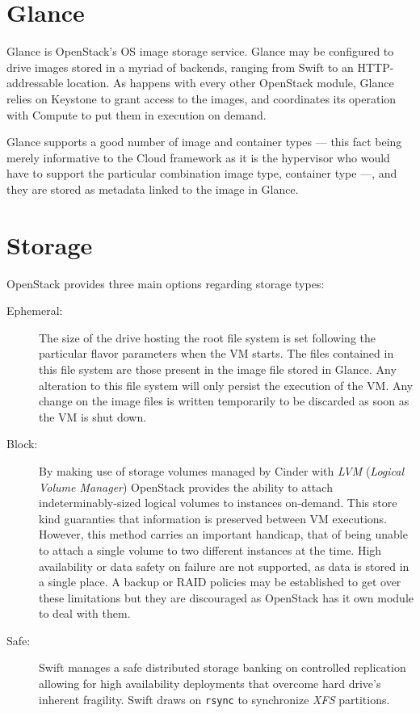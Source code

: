 \section{Glance}\label{sec:glance}
\noindent Glance is OpenStack's OS image storage service. Glance may be configured to drive images stored in a myriad of backends, ranging from Swift to an HTTP-addressable location. As happens with every other OpenStack module, Glance relies on Keystone to grant access to the images, and coordinates its operation with Compute to put them in execution on demand.

Glance supports a good number of image and container types --- this fact being merely informative to the Cloud framework as it is the hypervisor who would have to support the particular combination image type, container type ---, and they are stored as metadata linked to the image in Glance.

\section{Storage}\label{sec:almacenamiento}
\noindent OpenStack provides three main options regarding storage types:

\begin{description}
 \item[Ephemeral:] The size of the drive hosting the root file system is set following the particular flavor parameters when the VM starts. The files contained in this file system are those present in the image file stored in Glance. Any alteration to this file system will only persist the execution of the VM. Any change on the image files is written temporarily to be discarded as soon as the VM is shut down.
 \item[Block:] By making use of storage volumes managed by Cinder with \emph{LVM} (\emph{Logical Volume Manager}) OpenStack provides the ability to attach indeterminably-sized logical volumes to instances on-demand. This store kind guaranties that information is preserved between VM executions. However, this method carries an important handicap, that of being unable to attach a single volume to two different instances at the time. High availability or data safety on failure are not supported, as data is stored in a single place. A backup or RAID policies may be established to get over these limitations but they are discouraged as OpenStack has it own module to deal with them.
 \item[Safe:] Swift manages a safe distributed storage banking on controlled replication allowing for high availability deployments that overcome hard drive's inherent fragility. Swift draws on \texttt{rsync} to synchronize \emph{XFS} partitions.
\end{description}

